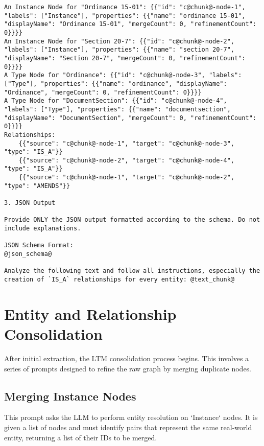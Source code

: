 \begin{lstlisting}[style=promptstyle, caption={Prompt for initial knowledge graph extraction from a text chunk.}, label={lst:prompt_kg_base}]
An Instance Node for "Ordinance 15-01": {{"id": "c@chunk@-node-1", "labels": ["Instance"], "properties": {{"name": "ordinance 15-01", "displayName": "Ordinance 15-01", "mergeCount": 0, "refinementCount": 0}}}}
An Instance Node for "Section 20-7": {{"id": "c@chunk@-node-2", "labels": ["Instance"], "properties": {{"name": "section 20-7", "displayName": "Section 20-7", "mergeCount": 0, "refinementCount": 0}}}}
A Type Node for "Ordinance": {{"id": "c@chunk@-node-3", "labels": ["Type"], "properties": {{"name": "ordinance", "displayName": "Ordinance", "mergeCount": 0, "refinementCount": 0}}}}
A Type Node for "DocumentSection": {{"id": "c@chunk@-node-4", "labels": ["Type"], "properties": {{"name": "documentsection", "displayName": "DocumentSection", "mergeCount": 0, "refinementCount": 0}}}}
Relationships:
    {{"source": "c@chunk@-node-1", "target": "c@chunk@-node-3", "type": "IS_A"}}
    {{"source": "c@chunk@-node-2", "target": "c@chunk@-node-4", "type": "IS_A"}}
    {{"source": "c@chunk@-node-1", "target": "c@chunk@-node-2", "type": "AMENDS"}}

3. JSON Output

Provide ONLY the JSON output formatted according to the schema. Do not include explanations.

JSON Schema Format:
@json_schema@

Analyze the following text and follow all instructions, especially the creation of `IS_A` relationships for every entity: @text_chunk@
\end{lstlisting}

\section{Entity and Relationship Consolidation}
After initial extraction, the LTM consolidation process begins. This involves a series of prompts designed to refine the raw graph by merging duplicate nodes.

\subsection{Merging Instance Nodes}
This prompt asks the LLM to perform entity resolution on `Instance` nodes. It is given a list of nodes and must identify pairs that represent the same real-world entity, returning a list of their IDs to be merged.

